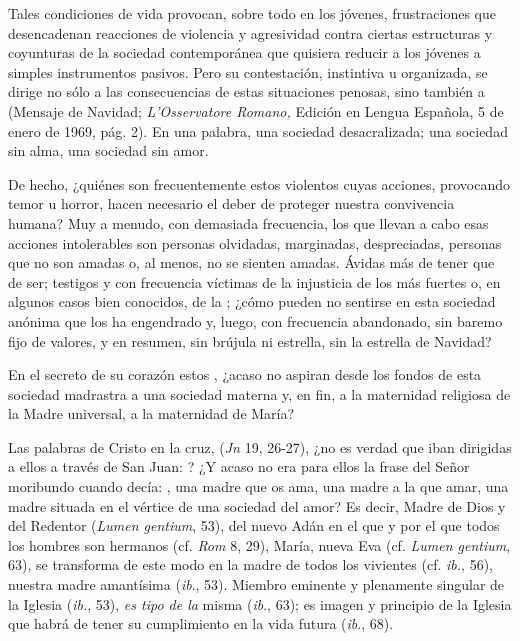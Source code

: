 \begin{body}
\begin{body}
Tales condiciones de vida provocan, sobre todo en los jóvenes, frustraciones que desencadenan reacciones de violencia y agresividad contra ciertas estructuras y coyunturas de la sociedad contemporánea que quisiera reducir a los jóvenes a simples instrumentos pasivos. Pero su contestación, instintiva u organizada, se dirige no sólo a las consecuencias de estas situaciones penosas, sino también a  (Mensaje de Navidad; \emph{L'Osservatore Romano,} Edición en Lengua Española, 5 de enero de 1969, pág. 2). En una palabra, una sociedad desacralizada; una sociedad sin alma, una sociedad sin amor.

De hecho, ¿quiénes son frecuentemente estos violentos cuyas acciones, provocando temor u horror, hacen necesario el deber de proteger nuestra convivencia humana? Muy a menudo, con demasiada frecuencia, los que llevan a cabo esas acciones intolerables son personas olvidadas, marginadas, despreciadas, personas que no son amadas o, al menos, no se sienten amadas. Ávidas más de tener que de ser; testigos y con frecuencia víctimas de la injusticia de los más fuertes o, en algunos casos bien conocidos, de la ; ¿cómo pueden no sentirse  en esta sociedad anónima que los ha engendrado y, luego, con frecuencia abandonado, sin baremo fijo de valores, y en resumen, sin brújula ni estrella, sin la estrella de Navidad?

En el secreto de su corazón estos , ¿acaso no aspiran desde los fondos de esta sociedad madrastra a una sociedad materna y, en fin, a la maternidad religiosa de la Madre universal, a la maternidad de María?

Las palabras de Cristo en la cruz,  (\emph{Jn} 19, 26-27), ¿no es verdad que iban dirigidas a ellos a través de San Juan: ? ¿Y acaso no era para ellos la frase del Señor moribundo cuando decía: , una madre que os ama, una madre a la que amar, una madre situada en el vértice de una sociedad del amor? Es decir, Madre de Dios y del Redentor (\emph{Lumen gentium}, 53), del nuevo Adán en el que y por el que todos los hombres son hermanos (cf. \emph{Rom} 8, 29), María, nueva Eva (cf. \emph{Lumen gentium}, 63), se transforma de este modo en la madre de todos los vivientes (cf. \emph{ib.}, 56), nuestra madre amantísima (\emph{ib}., 53). Miembro eminente y plenamente singular de la Iglesia (\emph{ib.}, 53), \emph{es tipo de la} misma (\emph{ib}., 63); es imagen y principio de la Iglesia que habrá de tener su cumplimiento en la vida futura (\emph{ib}., 68).


\end{body}
\end{body}
